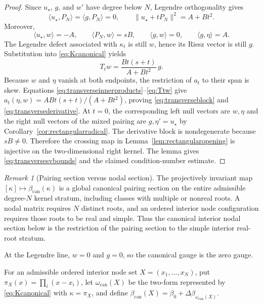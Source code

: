\documentclass[11pt,a4paper]{article}
\theoremstyle{definition}
\theoremstyle{remark}
\newtheorem{remark}[theorem]{Remark}
\begin{document}
\begin{proof}
Since $u_\star$, $g$, and $w'$ have degree below $N$, Legendre orthogonality gives
\begin{equation}\label{eq:transverseorthogonality}
 \langle u_\star,P_N\rangle=\langle g,P_N\rangle=0,
 \qquad \|u_\star+tP_N\|^2=A+Bt^2.
\end{equation}
Moreover,
\begin{equation}\label{eq:transverseinnerproducts}
 \langle u_\star,w\rangle=-A,
 \qquad \langle P_N,w\rangle=sB,
 \qquad \langle g,w\rangle=0,
 \qquad \langle g,\eta\rangle=A.
\end{equation}
The Legendre defect associated with $\kappa_t$ is still $w$, hence its Riesz vector is still
$g$.  Substitution into \eqref{eq:Kcanonical} yields
\begin{equation}\label{eq:Ttw}
 T_tw=\frac{Bt(s+t)}{A+Bt^2}\,g.
\end{equation}
Because $w$ and $\eta$ vanish at both endpoints, the restriction of $a_t$ to their span is
skew.  Equations \eqref{eq:transverseinnerproducts}--\eqref{eq:Ttw} give
$a_t(\eta,w)=ABt(s+t)/(A+Bt^2)$, proving \eqref{eq:transverseblock} and
\eqref{eq:transversederivative}.  At $t=0$, the corresponding left null vectors are
$w,\eta$ and the right null vectors of the mixed pairing are $g,\eta'=u_\star$ by
Corollary~\ref{cor:rectangularradical}.  The derivative block is nondegenerate because
$sB\neq0$.  Therefore the crossing map in Lemma~\ref{lem:rectangularopening} is injective
on the two-dimensional right kernel.  The lemma gives \eqref{eq:transversesvbounds} and the
claimed condition-number estimate.
\end{proof}

\begin{remark}[Pairing section versus nodal section]
The projectively invariant map $[\kappa]\mapsto\beta_{\mathrm{can}}(\kappa)$ is a global
canonical pairing section on the entire admissible degree-$N$ kernel stratum, including
classes with multiple or nonreal roots.  A nodal matrix requires $N$ distinct roots, and an
ordered interior node configuration requires those roots to be real and simple.  Thus the
canonical interior nodal section below is the restriction of the pairing section to the
simple interior real-root stratum.
\end{remark}

At the Legendre line, $w=0$ and $g=0$, so the canonical gauge is the zero gauge.

For an admissible ordered interior node set $X=(x_1,\ldots,x_N)$, put
$\pi_X(x)=\prod_i(x-x_i)$, let $\omega_{\mathrm{can}}(X)$ be the two-form represented by
\eqref{eq:Kcanonical} with $\kappa=\pi_X$, and define
$\beta_{\mathrm{can}}(X)=\beta_0+\Delta\beta_{\omega_{\mathrm{can}}(X)}$.
\end{document}
